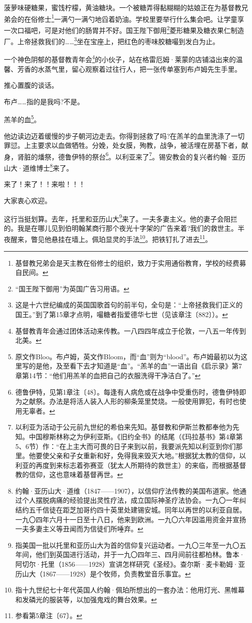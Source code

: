 \par 菠萝味硬糖果，蜜饯柠檬，黄油糖块。一个被糖弄得黏糊糊的姑娘正在为基督教兄弟会的在俗修士\footnote{基督教兄弟会是天主教在俗修士的组织，致力于实用通俗教育，学校的经费募自民间。}一满勺一满勺地舀着奶油。学校里要举行什么集会吧。让学童享一次口福吧，可是对他们的肠胃并不好。国王陛下御用\footnote{“国王陛下御用”为英国广告习用语。}菱形糖果及糖衣果仁制造厂。上帝拯救我们的……\footnote{这是十六世纪编成的英国国歌首句的前半句，全句是：“上帝拯救我们正义的国王。”到了第15章才点明，嘬糖者指爱德华七世（见该章注〔882〕）。}坐在宝座上，把红色的枣味胶糖嘬到发白为止。
\par 一个神色阴郁的基督教青年会\footnote{基督教青年会通过团体活动来传教。一八四四年成立于伦敦，一八五一年传到北美。}的小伙子，站在格雷厄姆·莱蒙的店铺溢出来的温馨、芳香的水蒸气里，留心观察着过往行人，把一张传单塞到布卢姆先生手里。
\par 推心置腹的谈话。
\par 布卢……指的是我吗?不是。
\par 羔羊的血\footnote{原文作Bloo。布卢姆，英文作Bloom，而“血”则为“blood”。布卢姆最初以为这里写的是他，及至看下去才知道是“血”。“羔羊的血”一语出自《启示录》第7章第14节：“他们用羔羊的血把自己的衣服洗得干净洁白了。”}。
\par 他边读边迈着缓慢的步子朝河边走去。你得到拯救了吗?在羔羊的血里洗涤了一切罪愆。上主要求以血做牺牲。分娩，处女膜，殉教，战争，被活埋在房基下者，献身，肾脏的燔祭，德鲁伊特的祭台\footnote{德鲁伊特，见第1章注〔48〕。每逢有人病危或在战争中受重伤时，德鲁伊特即为之献祭。办法是将活人装入人形的柳条笼里焚烧。一般使用罪犯，有时也使用无辜者。}。以利亚来了\footnote{以利亚为活动于公元前九世纪的希伯来先知。基督教和伊斯兰教都奉他为先知。中国穆斯林称之为伊利亚斯。《旧约全书》的结尾（《玛拉基书》第4章第5、6节）作：“在上主大而可畏的日子来到以前，我要派先知以利亚到你们那里。他要使父亲和子女重新和好，免得我来毁灭大地。”根据犹太教的信仰，以利亚的再度到来标志着弥赛亚（犹太人所期待的救世主）的来临，而根据基督教的信仰，这也意味着基督再世。}。锡安教会的复兴者约翰·亚历山大·道维博士\footnote{约翰·亚历山大·道维（1847——1907），以信仰疗法传教的美国布道家。他通过个人摆脱病痛的经验提出灵性疗法，成立国际神圣疗法协会。一九〇一年纠结约五千信徒在距芝加哥约四十英里处建锡安城。同年以再世的以利亚自居。一九〇四年六月十一日至十八日，他来到欧洲。一九〇六年因滥用资金并宣扬一夫多妻主义等丑闻而为信徒们所唾弃。}来了。
\par 来了！来了！！来啦！！！
\par 大家衷心欢迎。
\par 这行当挺划算。去年，托里和亚历山大\footnote{指美国一批以托里和亚历山大为首的信仰复兴运动者。一九〇三年至一九〇五年间，他们到英国进行活动，并于一九〇四年三、四月间前往都柏林。鲁本·阿切尔·托里（1856——1928）宣讲怎样研究《圣经》。查尔斯·麦卡勒姆·亚历山大（1867——1928）是个牧师，负责教堂音乐事宜。}来了。一夫多妻主义。他的妻子会阻拦的。我是在哪儿见到伯明翰某商行那个夜光十字架的广告来着?我们的救世主。半夜醒来，瞥见他悬挂在墙上。佩珀显灵的手法\footnote{指十九世纪七十年代英国人约翰·佩珀所想出的一套办法：他用灯光、黑帷幕和发磷光的服装等，以加强鬼戏的舞台效果。}。把铁钉扎了进去\footnote{参看第5章注〔67〕。}。
